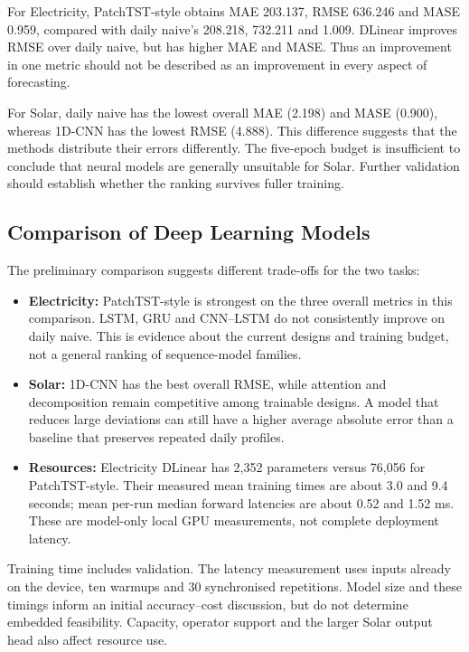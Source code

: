 \documentclass[11pt,a4paper]{article}
\begin{document}


For Electricity, PatchTST-style obtains MAE 203.137, RMSE 636.246 and MASE 0.959, compared with daily naive's 208.218, 732.211 and 1.009. DLinear improves RMSE over daily naive, but has higher MAE and MASE. Thus an improvement in one metric should not be described as an improvement in every aspect of forecasting.

For Solar, daily naive has the lowest overall MAE (2.198) and MASE (0.900), whereas 1D-CNN has the lowest RMSE (4.888). This difference suggests that the methods distribute their errors differently. The five-epoch budget is insufficient to conclude that neural models are generally unsuitable for Solar. Further validation should establish whether the ranking survives fuller training.

\FloatBarrier
\subsection{Comparison of Deep Learning Models}
The preliminary comparison suggests different trade-offs for the two tasks:
\begin{itemize}
\item \textbf{Electricity:} PatchTST-style is strongest on the three overall metrics in this comparison. LSTM, GRU and CNN--LSTM do not consistently improve on daily naive. This is evidence about the current designs and training budget, not a general ranking of sequence-model families.
\item \textbf{Solar:} 1D-CNN has the best overall RMSE, while attention and decomposition remain competitive among trainable designs. A model that reduces large deviations can still have a higher average absolute error than a baseline that preserves repeated daily profiles.
\item \textbf{Resources:} Electricity DLinear has 2,352 parameters versus 76,056 for PatchTST-style. Their measured mean training times are about 3.0 and 9.4 seconds; mean per-run median forward latencies are about 0.52 and 1.52 ms. These are model-only local GPU measurements, not complete deployment latency.
\end{itemize}
Training time includes validation. The latency measurement uses inputs already on the device, ten warmups and 30 synchronised repetitions. Model size and these timings inform an initial accuracy--cost discussion, but do not determine embedded feasibility. Capacity, operator support and the larger Solar output head also affect resource use.
\end{document}
